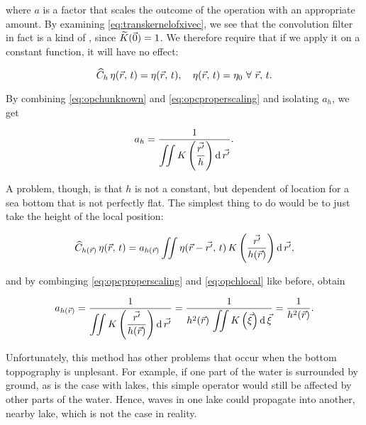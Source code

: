 where $a$ is a factor that scales the outcome of the operation with an appropriate amount. By examining \eqref{eq:transkernelofxivec}, we see that the convolution filter in fact is a kind of , since $\widetilde{K}(\vec{0}) = 1$. We therefore require that if we apply it on a constant function, it will have no effect:

\begin{equation} \label{eq:opcproperscaling}
\widehat{C}_h\,\eta(\vec{r},\,t) = \eta(\vec{r},\,t),\quad\eta(\vec{r},\,t) = \eta_0\ \forall\ \vec{r},\,t.
\end{equation}

By combining \eqref{eq:opchunknown} and \eqref{eq:opcproperscaling} and isolating $a_h$, we get

\begin{equation} \label{eq:scalinghunknown}
a_h = \frac{1}{\displaystyle\iint K\left(\frac{\vec{r'}}{h}\right) \operatorname{d}\vec{r'}}.
\end{equation}

A problem, though, is that $h$ is not a constant, but dependent of location for a sea bottom that is not perfectly flat. The simplest thing to do would be to just take the height of the local position:

\begin{equation} \label{eq:opchlocal}
\widehat{C}_{h(\vec{r})}\,\eta(\vec{r},\,t) = a_{h(\vec{r})}\iint \eta(\vec{r}-\vec{r'},\,t)\,K\left(\frac{\vec{r'}}{h(\vec{r})}\right) \operatorname{d}\vec{r'},
\end{equation}

and by combinging \eqref{eq:opcproperscaling} and \eqref{eq:opchlocal} like before, obtain

\begin{equation} \label{eq:ahlocal}
a_{h(\vec{r})} = \frac{1}{\displaystyle\iint K\left(\frac{\vec{r'}}{h(\vec{r})}\right) \operatorname{d}\vec{r'}} = \frac{1}{h^2(\vec{r})\,\displaystyle\iint K\left(\vec{\xi}\right)\operatorname{d}\vec{\xi}} = \frac{1}{h^2(\vec{r})}.
\end{equation}

Unfortunately, this method has other problems that occur when the bottom toppography is unplesant. For example, if one part of the water is surrounded by ground, as is the case with lakes, this simple operator would still be affected by other parts of the water. Hence, waves in one lake could propagate into another, nearby lake, which is not the case in reality.

